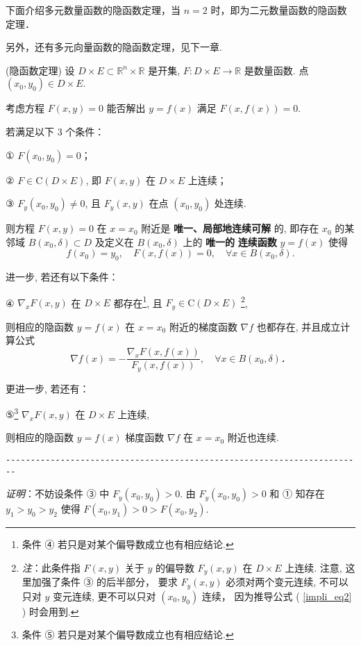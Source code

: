 下面介绍多元数量函数的隐函数定理，当 $n=2$ 时，即为二元数量函数的隐函数定理． 

另外，还有多元向量函数的隐函数定理，见下一章. 

 \begin{theorem}{(隐函数定理)}
 设 $D\times E\subset\mathbb{R}^{n}\times\mathbb{R}$ 是开集, $F:D\times E\rightarrow\mathbb{R}$
是数量函数. 点 $(x_{0},y_{0})\in D\times E.$ 

考虑方程 $F(x,y)=0$ 能否解出 $y=f(x)$ 满足 $F(x,f(x))=0.$ 

若满足以下 3 个条件：

① $F(x_{0},y_{0})=0$；

② $F\in\mathrm{C}(D\times E)$, 即 $F(x,y)$ 在 $D\times E$ 上连续； 

③ $F_{y}(x_{0},y_{0})\neq0$, 且 $F_{y}(x,y)$ 在点 $(x_0,y_0)$ 处连续.

则方程 $F(x,y)=0$ 在 $x=x_{0}$ 附近是\textbf{ 唯一、局部地连续可解} 的, 即存在 $x_{0}$
的某邻域 $B(x_{0},\delta)\subset D$ 及定义在 $B(x_{0},\delta)$ 上的 \textbf{唯一的} \textbf{
连续函数} $y=f(x)$ 使得
\[
f(x_{0})=y_{0},\quad F(x,f(x))=0,\quad\forall x\in B(x_{0},\delta).
\]

进一步, 若还有以下条件：

④ $\nabla_{x}F(x,y)$ 在 $D\times E$
都存在\footnote{条件 ④ 若只是对某个偏导数成立也有相应结论. }, 且 $F_y\in\mathrm{C}(D\times E)$ \footnote{\textsl{注}：此条件指 $F(x,y)$ 关于 $y$ 的偏导数 $F_{y}(x,y)$
 在 $D\times E$ 上连续. 注意, 这里加强了条件 ③ 的后半部分， 要求 $F_{y}(x,y)$ 必须对两个变元连续, 不可以只对 $y$
 变元连续, 更不可以只对 $(x_0,y_0)$ 连续， 因为推导公式 ( \autoref{impli_eq2} ) 时会用到.},

则相应的隐函数 $y=f(x)$ 在 $x=x_{0}$ 附近的梯度函数 $\nabla f$ 也都存在, 并且成立计算公式
\[
\nabla f(x)=-{\displaystyle \frac{\nabla_{x}F(x,f(x))}{F_{y}(x,f(x))}},\quad\forall x\in B(x_{0},\delta)．
\]

更进一步, 若还有：

⑤\footnote{条件 ⑤ 若只是对某个偏导数成立也有相应结论. } $\nabla_{x}F(x,y)$ 在 $D\times E$
上连续, 

则相应的隐函数 $y=f(x)$ 梯度函数 $\nabla f$ 在 $x=x_{0}$ 附近也连续.

\verb|------------------------------------------------------------------------|

\textsl{证明}：不妨设条件 ③ 中 $F_{y}(x_{0},y_{0})>0.$ 由 $F_{y}(x_{0},y_{0})>0$ 和
① 知存在 $y_{1}>y_{0}>y_{2}$ 使得 $F(x_{0},y_{1})>0>F(x_{0},y_{2})$. 


\end{theorem}
